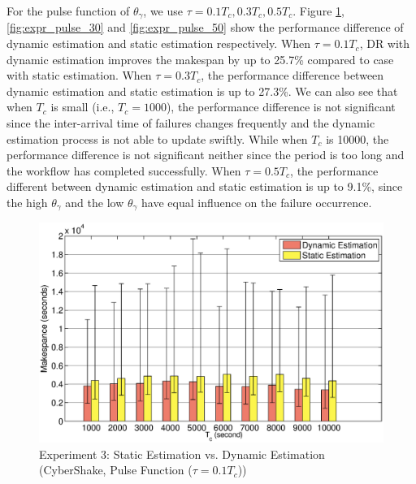 \documentclass{IOS-Book-Article}
\begin{document}
For the pulse function of $\theta_{\gamma}$, we use $\tau=0.1T_c, 0.3T_c, 0.5T_c$. Figure \ref{fig:expr_pulse_10}, \ref{fig:expr_pulse_30} and \ref{fig:expr_pulse_50} show the performance difference of dynamic estimation and static estimation respectively. When $\tau=0.1T_c$, DR with dynamic estimation improves the makespan by up to 25.7\% compared to case with static estimation. When $\tau=0.3T_c$, the performance difference between dynamic estimation and static estimation is up to 27.3\%. We can also see that when $T_c$ is small (i.e., $T_c=1000$), the performance difference is not significant since the inter-arrival time of failures changes frequently and the dynamic estimation process is not able to update swiftly. While when $T_c$ is 10000, the performance difference is not significant neither since the period is too long and the workflow has completed successfully. When $\tau=0.5T_c$, the performance different between dynamic estimation and static estimation is up to 9.1\%, since the high $\theta_{\gamma}$ and the low $\theta_{\gamma}$ have equal influence on the failure occurrence. 


\begin{figure}[!htb]
\centering
  \includegraphics[width=1\linewidth]{pulse_t10.eps}
  \caption{Experiment 3: Static Estimation vs. Dynamic Estimation (CyberShake, Pulse Function ($\tau=0.1T_c$))}
  \label{fig:expr_pulse_10}
\end{figure}
\end{document}
